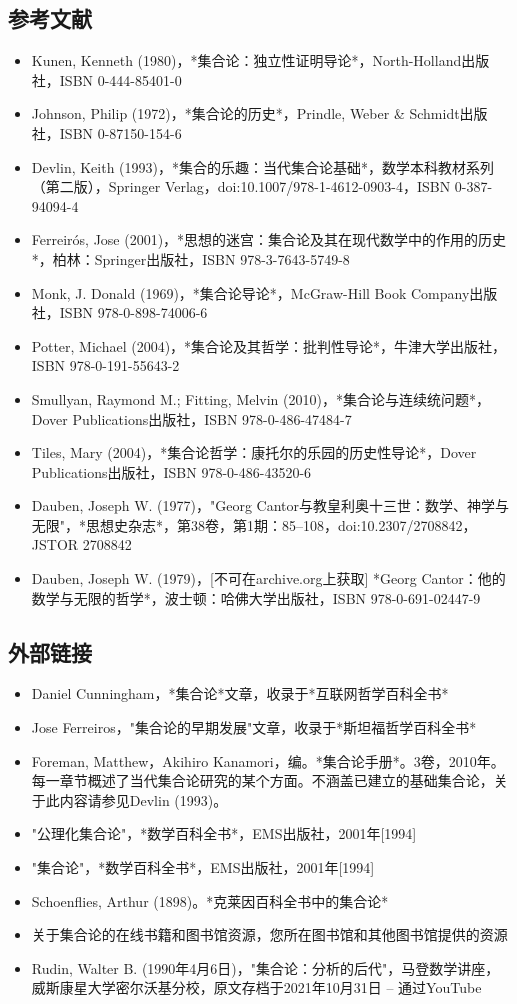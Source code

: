 \subsection{参考文献}
\begin{itemize}
\item Kunen, Kenneth (1980)，*集合论：独立性证明导论*，North-Holland出版社，ISBN 0-444-85401-0
\item Johnson, Philip (1972)，*集合论的历史*，Prindle, Weber & Schmidt出版社，ISBN 0-87150-154-6
\item Devlin, Keith (1993)，*集合的乐趣：当代集合论基础*，数学本科教材系列（第二版），Springer Verlag，doi:10.1007/978-1-4612-0903-4，ISBN 0-387-94094-4
\item Ferreirós, Jose (2001)，*思想的迷宫：集合论及其在现代数学中的作用的历史*，柏林：Springer出版社，ISBN 978-3-7643-5749-8
\item Monk, J. Donald (1969)，*集合论导论*，McGraw-Hill Book Company出版社，ISBN 978-0-898-74006-6
\item Potter, Michael (2004)，*集合论及其哲学：批判性导论*，牛津大学出版社，ISBN 978-0-191-55643-2
\item Smullyan, Raymond M.; Fitting, Melvin (2010)，*集合论与连续统问题*，Dover Publications出版社，ISBN 978-0-486-47484-7
\item Tiles, Mary (2004)，*集合论哲学：康托尔的乐园的历史性导论*，Dover Publications出版社，ISBN 978-0-486-43520-6
\item Dauben, Joseph W. (1977)，"Georg Cantor与教皇利奥十三世：数学、神学与无限"，*思想史杂志*，第38卷，第1期：85–108，doi:10.2307/2708842，JSTOR 2708842
\item Dauben, Joseph W. (1979)，[不可在archive.org上获取] *Georg Cantor：他的数学与无限的哲学*，波士顿：哈佛大学出版社，ISBN 978-0-691-02447-9
\end{itemize}
\subsection{外部链接}
\begin{itemize}
\item Daniel Cunningham，*集合论*文章，收录于*互联网哲学百科全书*
\item Jose Ferreiros，"集合论的早期发展"文章，收录于*斯坦福哲学百科全书*
\item Foreman, Matthew，Akihiro Kanamori，编。*集合论手册*。3卷，2010年。每一章节概述了当代集合论研究的某个方面。不涵盖已建立的基础集合论，关于此内容请参见Devlin (1993)。
\item "公理化集合论"，*数学百科全书*，EMS出版社，2001年[1994]
\item "集合论"，*数学百科全书*，EMS出版社，2001年[1994]
\item Schoenflies, Arthur (1898)。*克莱因百科全书中的集合论*
\item 关于集合论的在线书籍和图书馆资源，您所在图书馆和其他图书馆提供的资源
\item Rudin, Walter B. (1990年4月6日)，"集合论：分析的后代"，马登数学讲座，威斯康星大学密尔沃基分校，原文存档于2021年10月31日 – 通过YouTube
\end{itemize}